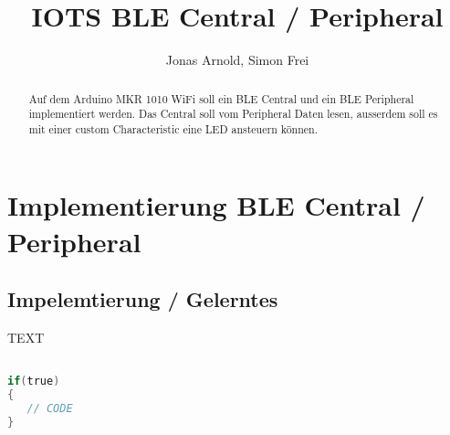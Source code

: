 \documentclass{article}
\title{IOTS BLE Central / Peripheral}
\author{Jonas Arnold, Simon Frei}
\begin{document}
\maketitle

\begin{abstract}
Auf dem Arduino MKR 1010 WiFi soll ein BLE Central und ein BLE Peripheral implementiert werden. Das Central soll vom Peripheral Daten lesen, ausserdem soll es mit einer custom Characteristic eine LED ansteuern können. 
\end{abstract}

\section{Implementierung BLE Central / Peripheral}

\subsection{Impelemtierung / Gelerntes}

TEXT

\begin{lstlisting}[style=CStyle, language=C, caption=Moin meister]  % Start your code-block

if(true)
{
   // CODE
}

\end{lstlisting}
\end{document}
